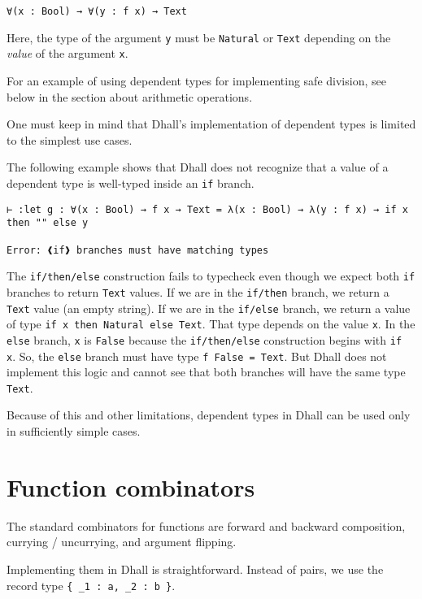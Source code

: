 \begin{lstlisting}[language=Dhall]
∀(x : Bool) → ∀(y : f x) → Text
\end{lstlisting}


Here, the type of the argument \lstinline!y! must be \lstinline!Natural! or \lstinline!Text! depending on the \emph{value} of the argument \lstinline!x!.


For an example of using dependent types for implementing safe division, see below in the section about arithmetic operations.


One must keep in mind that Dhall's implementation of dependent types is limited to the simplest use cases.


The following example shows that Dhall does not recognize that a value of a dependent type is well-typed inside an \lstinline!if! branch.


\begin{lstlisting}[language=Dhall]
⊢ :let g : ∀(x : Bool) → f x → Text = λ(x : Bool) → λ(y : f x) → if x then "" else y

Error: ❰if❱ branches must have matching types
\end{lstlisting}


The \lstinline!if/then/else! construction fails to typecheck even though we expect both \lstinline!if! branches to return \lstinline!Text! values.
If we are in the \lstinline!if/then! branch, we return a \lstinline!Text! value (an empty string).
If we are in the \lstinline!if/else! branch, we return a value of type \lstinline!if x then Natural else Text!.
That type depends on the value \lstinline!x!.
In the \lstinline!else! branch, \lstinline!x! is \lstinline!False! because the \lstinline!if/then/else! construction begins with \lstinline!if x!.
So, the \lstinline!else! branch must have type \lstinline!f False = Text!.
But Dhall does not implement this logic and cannot see that both branches will have the same type \lstinline!Text!.


Because of this and other limitations, dependent types in Dhall can be used only in sufficiently simple cases. 


\section{Function combinators}


The standard combinators for functions are forward and backward composition, currying / uncurrying, and argument flipping.


Implementing them in Dhall is straightforward.
Instead of pairs, we use the record type \lstinline!{ _1 : a, _2 : b }!. 


